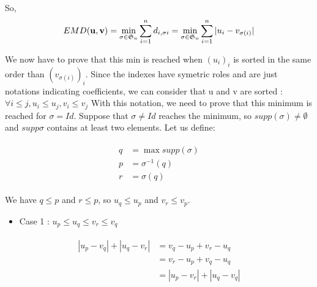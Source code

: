\documentclass{article}
\begin{document}
	So,
	\begin{equation*}
	EMD(\mathbf{u},\mathbf{v}) = \min\limits_{\sigma \in \mathfrak{S}_n} \sum_{i=1}^n d_{i,\sigma{i}} = \min\limits_{\sigma \in \mathfrak{S}_n} \sum_{i=1}^n |u_i-v_{\sigma (i)}|
	\newline
	\newline
	\end{equation*}
	
	We now have to prove that this min is reached when $(u_i)_i$ is sorted in the same order than $(v_{\sigma (i)})_i$. Since the indexes have symetric roles and are just notations indicating coefficients, we can consider that u and v are sorted :\newline
  $\forall i \leq j, u_i \leq u_j, v_i \leq v_j$\newline
  With this notation, we need to prove that this minimum is reached for $\sigma = Id$.\newline
  \newline
  Suppose that $\sigma \neq Id$ reaches the minimum, so $supp(\sigma)\neq \emptyset$ and $supp \sigma$ contains at least two elements. Let us define:
 
  \begin{multline*}
	\begin{split}
	q	&=  \max supp(\sigma)\\
	p	&=  \sigma^{-1}(q) \\
	r 	&= \sigma (q)
	\end{split}
	\end{multline*}
	
	We have $q\leq p$ and $r\leq p$, so $u_q\leq u_p$ and $v_r\leq v_p$.
	
	
	\begin{itemize}
	\item Case 1 : $u_p \leq u_q \leq v_r \leq v_q$
	\end{itemize}
	
	\begin{multline*}
	\begin{split}
	|u_p-v_q| + |u_q-v_r|	&=  v_q-u_p+v_r-u_q\\
		&=  v_r-u_p+v_q-u_q \\
	 	&= |u_p-v_r|+|u_q-v_q|
	\end{split}
	\end{multline*}
		
\end{document}
